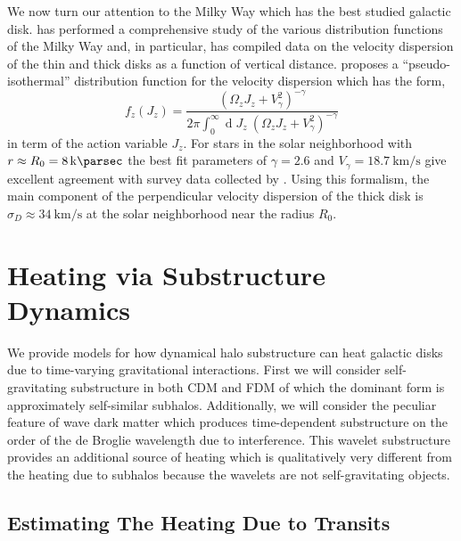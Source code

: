 \documentclass[usenatbib]{mnras}
\renewcommand{\d}[1]{\! \mathrm{d}#1 \:}
\renewcommand{\d}[1]{\ensuremath{\operatorname{d}\!{#1}}}
\begin{document}
\par
We now turn our attention to the Milky Way which has the best studied galactic disk. \cite{milky_way} has performed a comprehensive study of the various distribution functions of the Milky Way and, in particular, has compiled data on the velocity dispersion of the thin and thick disks as a function of vertical distance. \cite{milky_way} proposes a ``pseudo-isothermal'' distribution function for the velocity dispersion which has the form,
\begin{equation}
f_z(J_z) = \frac{\left( \Omega_z J_z + V_\gamma^2 \right)^{-\gamma}}{2 \pi \int_{0}^{\infty} \d{J_z} \: \left( \Omega_z J_z + V_\gamma^2 \right)^{-\gamma} }
\end{equation}  
in term of the action variable $J_z$. For stars in the solar neighborhood with $r \approx R_0 =  \SI{8}{\kilo \parsec}$ the best fit parameters of $\gamma = 2.6$ and $V_\gamma = \SI{18.7}{\kilo \meter \per \second}$ give excellent agreement with survey data collected by \cite{milkyway-thickdisk}. Using this formalism, the main component of the perpendicular velocity dispersion of the thick disk is $\sigma_D \approx \SI{34}{\kilo \meter \per \second}$ at the solar neighborhood near the radius $R_0$.   



\section{Heating via Substructure Dynamics}

We provide models for how dynamical halo substructure can heat galactic disks due to time-varying gravitational interactions. First we will consider self-gravitating substructure in both CDM and FDM of which the dominant form is approximately self-similar subhalos. Additionally, we will consider the peculiar feature of wave dark matter which produces time-dependent substructure on the order of the de Broglie wavelength due to interference. This wavelet substructure provides an additional source of heating which is qualitatively very different from the heating due to subhalos because the wavelets are not self-gravitating objects. 

\subsection{Estimating The Heating Due to Transits}
\end{document}
